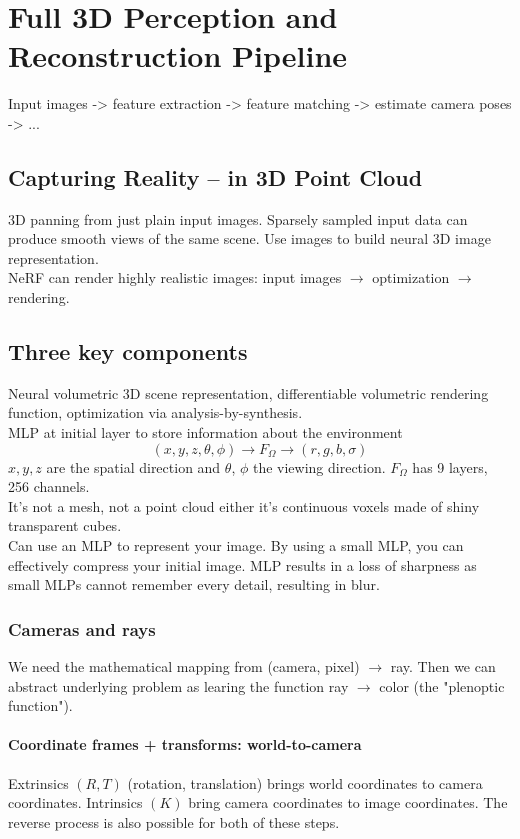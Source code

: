 \documentclass[11pt, oneside]{book}
\begin{document}
\chapter{Full 3D Perception and Reconstruction Pipeline}
Input images -> feature extraction -> feature matching -> estimate camera poses -> ... 

\section{Capturing Reality -- in 3D Point Cloud}

3D panning from just plain input images. Sparsely sampled input data can produce smooth views of the same scene. Use images to build neural 3D image representation. \\ 

\noindent NeRF can render highly realistic images: input images $\to$ optimization $\to$ rendering.

\section{Three key components}
Neural volumetric 3D scene representation, differentiable volumetric rendering function, optimization via analysis-by-synthesis. \\ 

\noindent MLP at initial layer to store information about the environment 
\[
  (x,y,z,\theta,\phi) \to F_{\Omega} \to (r,g,b,\sigma)
\]
$x,y,z$ are the spatial direction and $\theta$, $\phi$ the viewing direction. $F_\Omega$ has 9 layers, 256 channels. \\ 

\noindent It's not a mesh, not a point cloud either it's continuous voxels made of shiny transparent cubes. \\ 

\noindent Can use an MLP to represent your image. By using a small MLP, you can effectively compress your initial image. MLP results in a loss of sharpness as small MLPs cannot remember every detail, resulting in blur.

\subsection{Cameras and rays}
We need the mathematical mapping from (camera, pixel) $\to$ ray. Then we can abstract underlying problem as learing the function ray $\to$ color (the "plenoptic function").
\subsubsection{Coordinate frames + transforms: world-to-camera}
Extrinsics $(R,T)$ (rotation, translation) brings world coordinates to camera coordinates. Intrinsics $(K)$ bring camera coordinates to image coordinates. The reverse process is also possible for both of these steps. 
\end{document}
